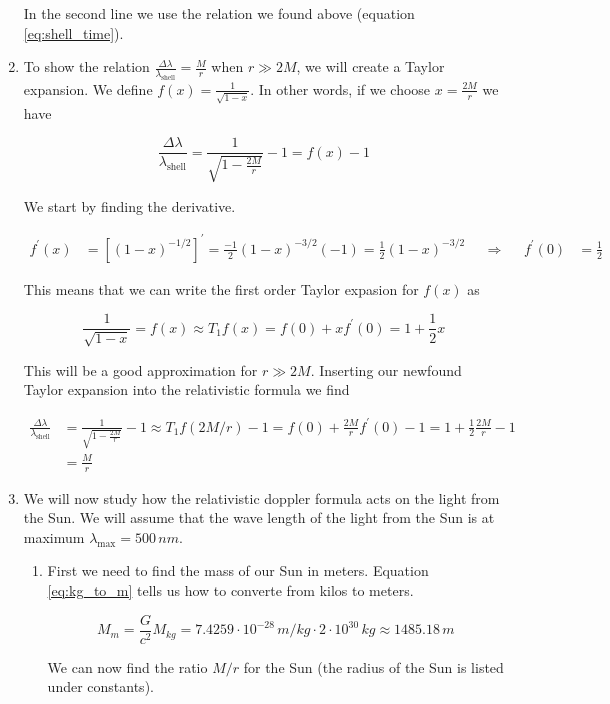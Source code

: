 \documentclass[a4paper,10pt,english]{article}
\begin{document}
\begin{enumerate}
In the second line we use the relation we found above (equation \ref{eq:shell_time}).
  
\item To show the relation $\frac{\Delta \lambda}{\lambda_{\text{shell}}}=\frac{M}{r}$ when $r\gg2M$, we will create a Taylor expansion. We define $f(x)=\frac{1}{\sqrt{1-x}}$. In other words, if we choose $x=\frac{2M}{r}$ we have

\[\frac{\Delta \lambda}{\lambda_{\text{shell}}}=\frac{1}{\sqrt{1-\frac{2M}{r}}}-1=f(x)-1\]

We start by finding the derivative.

\begin{align*}
f^{\prime}(x)&=\left[(1-x)^{-1/2}\right]^{\prime}=\frac{-1}{2}(1-x)^{-3/2}(-1)=\frac{1}{2}(1-x)^{-3/2} &&\Rightarrow&& f^{\prime}(0)&=\frac{1}{2}
\end{align*}  

This means that we can write the first order Taylor expasion for $f(x)$ as

\begin{equation*}
\frac{1}{\sqrt{1-x}}=f(x)\approx T_{1}f(x)=f(0)+xf^{\prime}(0)=1+\frac{1}{2}x
\end{equation*}

This will be a good approximation for $r\gg 2M$. Inserting our newfound Taylor expansion into the relativistic  formula we find

\begin{align*}
\frac{\Delta \lambda}{\lambda_{\text{shell}}}&=\frac{1}{\sqrt{1-\frac{2M}{r}}}-1\approx T_{1}f(2M/r)-1=f(0)+\frac{2M}{r}f^{\prime}(0)-1=1+\frac{1}{2}\frac{2M}{r}-1\\
&=\frac{M}{r}
\end{align*}


\item We will now study how the relativistic doppler formula acts on the light from the Sun. We will assume that the wave length of the light from the Sun is at maximum $\lambda_{\text{max}}=500\,nm$.

\begin{enumerate}

\item First we need to find the mass of our Sun in meters. Equation \ref{eq:kg_to_m} tells us how to converte from kilos to meters.

\[M_{m}=\frac{G}{c^{2}}M_{kg}=7.4259\cdot10^{-28}\,m/kg\cdot2\cdot10^{30}\,kg\approx1485.18\,m\]

We can now find the ratio $M/r$ for the Sun (the radius of the Sun is listed under constants). 


\end{enumerate}
\end{enumerate}
\end{document}
